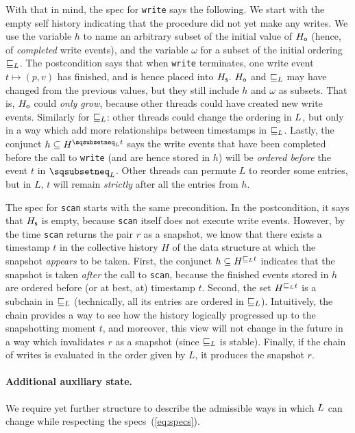 With that in mind, the spec for {\tt write} says the following. We
start with the empty self history indicating that the procedure did
not yet make any writes. We use the variable $h$ to name an arbitrary
subset of the initial value of $H_{\mathsf{o}}$ (hence, of \emph{completed}
write events), and the variable $\omega$ for a subset of the initial
ordering $\mathrel{\sqsubseteq_L}$. The postcondition says that when {\tt write}
terminates, one write event $t \mapsto (p, v)$ has finished, and is
hence placed into $H_{\mathsf{s}}$.  $H_{\mathsf{o}}$ and $\mathrel{\sqsubseteq_L}$ may have changed
from the previous values, but they still include $h$ and $\omega$ as
subsets. That is, $H_{\mathsf{o}}$ could \emph{only grow}, because other
threads could have created new write events. Similarly for $\mathrel{\sqsubseteq_L}$:
other threads could change the ordering in $L$, but only in a
way which add more relationships between timestamps in
$\mathrel{\sqsubseteq_L}$. Lastly, the conjunct
$h \subseteq H^{\hbox{}\sqsubsetneq_\ordlist t}$ says the write events
that have been completed before the call to {\tt write} (and are hence
stored in $h$) will be \emph{ordered before} the event $t$ in
$\sqsubsetneq_\ordlist$. Other threads can permute $L$ to reorder some
entries, but in $L$, $t$ will remain \emph{strictly} after all the
entries from $h$.

The spec for {\tt scan} starts with the same precondition. In the
postcondition, it says that $H_{\mathsf{s}}$ is empty, because {\tt scan}
itself does not execute write events. However, by the time {\tt scan}
returns the pair $r$ as a snapshot, we know that there exists a
timestamp $t$ in the collective history $H$ of the data structure at
which the snapshot \emph{appears} to be taken. First, the conjunct
$h \subseteq H^{\hbox{}\sqsubseteq_L t}$ indicates that the
snapshot is taken \emph{after} the call to {\tt scan}, because the
finished events stored in $h$ are ordered before (or at best, at)
timestamp $t$. Second, the set $H^{\hbox{}\sqsubseteq_L t}$ is
a subchain in $\sqsubseteq_L$ (technically, all its entries are
ordered in $\sqsubseteq_L$). Intuitively, the chain provides a
way to see how the history logically progressed up to the snapshotting
moment $t$, and moreover, this view will not change in the future in a
way which invalidates $r$ as a snapshot (since $\sqsubseteq_L$
is stable). Finally, if the chain of writes is evaluated in the order
given by $L$, it produces the snapshot $r$.

\paragraph{Additional auxiliary state.} 
We require yet further structure to describe the admissible ways in
which $L$ can change while respecting the
specs~(\ref{eq:specs}).

